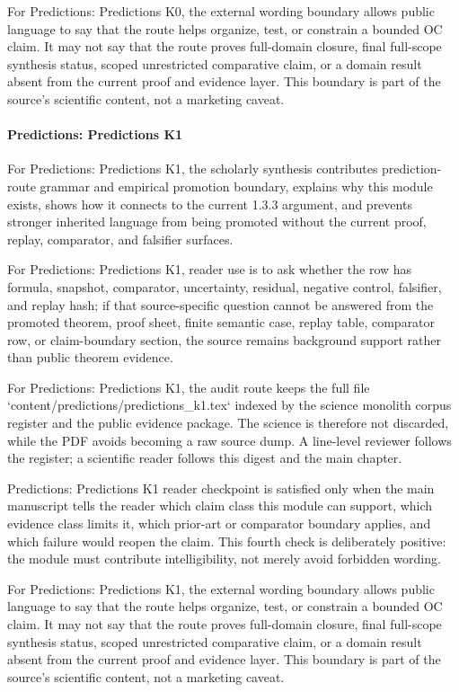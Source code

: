 For Predictions: Predictions K0, the external wording boundary allows public language to say that the route helps organize, test, or constrain a bounded OC claim. It may not say that the route proves full-domain closure, final full-scope synthesis status, scoped unrestricted comparative claim, or a domain result absent from the current proof and evidence layer. This boundary is part of the source's scientific content, not a marketing caveat.


\paragraph{Predictions: Predictions K1}

For Predictions: Predictions K1, the scholarly synthesis contributes prediction-route grammar and empirical promotion boundary, explains why this module exists, shows how it connects to the current 1.3.3 argument, and prevents stronger inherited language from being promoted without the current proof, replay, comparator, and falsifier surfaces.


For Predictions: Predictions K1, reader use is to ask whether the row has formula, snapshot, comparator, uncertainty, residual, negative control, falsifier, and replay hash; if that source-specific question cannot be answered from the promoted theorem, proof sheet, finite semantic case, replay table, comparator row, or claim-boundary section, the source remains background support rather than public theorem evidence.


For Predictions: Predictions K1, the audit route keeps the full file `content/predictions/predictions\_k1.tex` indexed by the science monolith corpus register and the public evidence package. The science is therefore not discarded, while the PDF avoids becoming a raw source dump. A line-level reviewer follows the register; a scientific reader follows this digest and the main chapter.


Predictions: Predictions K1 reader checkpoint is satisfied only when the main manuscript tells the reader which claim class this module can support, which evidence class limits it, which prior-art or comparator boundary applies, and which failure would reopen the claim. This fourth check is deliberately positive: the module must contribute intelligibility, not merely avoid forbidden wording.


For Predictions: Predictions K1, the external wording boundary allows public language to say that the route helps organize, test, or constrain a bounded OC claim. It may not say that the route proves full-domain closure, final full-scope synthesis status, scoped unrestricted comparative claim, or a domain result absent from the current proof and evidence layer. This boundary is part of the source's scientific content, not a marketing caveat.


